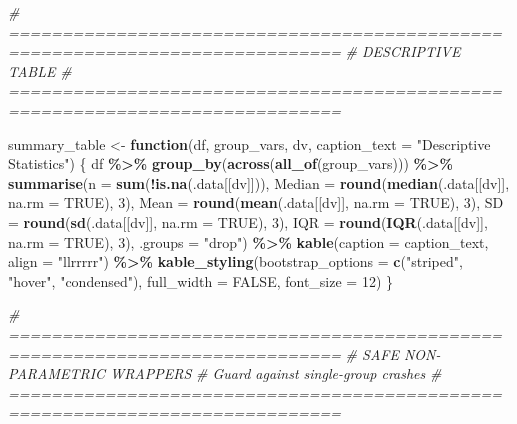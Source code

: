 \documentclass[
]{article}
\newenvironment{Shaded}{\begin{snugshade}}{\end{snugshade}}
\newcommand{\AttributeTok}[1]{\textcolor[rgb]{0.13,0.29,0.53}{#1}}
\newcommand{\CommentTok}[1]{\textcolor[rgb]{0.56,0.35,0.01}{\textit{#1}}}
\newcommand{\ConstantTok}[1]{\textcolor[rgb]{0.56,0.35,0.01}{#1}}
\newcommand{\ControlFlowTok}[1]{\textcolor[rgb]{0.13,0.29,0.53}{\textbf{#1}}}
\newcommand{\DecValTok}[1]{\textcolor[rgb]{0.00,0.00,0.81}{#1}}
\newcommand{\FunctionTok}[1]{\textcolor[rgb]{0.13,0.29,0.53}{\textbf{#1}}}
\newcommand{\NormalTok}[1]{#1}
\newcommand{\OtherTok}[1]{\textcolor[rgb]{0.56,0.35,0.01}{#1}}
\newcommand{\SpecialCharTok}[1]{\textcolor[rgb]{0.81,0.36,0.00}{\textbf{#1}}}
\newcommand{\StringTok}[1]{\textcolor[rgb]{0.31,0.60,0.02}{#1}}
\begin{document}
\begin{Shaded}
\begin{Highlighting}[]
\CommentTok{\# =============================================================================}
\CommentTok{\# DESCRIPTIVE TABLE}
\CommentTok{\# =============================================================================}

\NormalTok{summary\_table }\OtherTok{\textless{}{-}} \ControlFlowTok{function}\NormalTok{(df, group\_vars, dv,}
                          \AttributeTok{caption\_text =} \StringTok{"Descriptive Statistics"}\NormalTok{) \{}
\NormalTok{  df }\SpecialCharTok{\%\textgreater{}\%}
    \FunctionTok{group\_by}\NormalTok{(}\FunctionTok{across}\NormalTok{(}\FunctionTok{all\_of}\NormalTok{(group\_vars))) }\SpecialCharTok{\%\textgreater{}\%}
    \FunctionTok{summarise}\NormalTok{(}\AttributeTok{n      =} \FunctionTok{sum}\NormalTok{(}\SpecialCharTok{!}\FunctionTok{is.na}\NormalTok{(.data[[dv]])),}
              \AttributeTok{Median =} \FunctionTok{round}\NormalTok{(}\FunctionTok{median}\NormalTok{(.data[[dv]], }\AttributeTok{na.rm =} \ConstantTok{TRUE}\NormalTok{), }\DecValTok{3}\NormalTok{),}
              \AttributeTok{Mean   =} \FunctionTok{round}\NormalTok{(}\FunctionTok{mean}\NormalTok{(.data[[dv]],   }\AttributeTok{na.rm =} \ConstantTok{TRUE}\NormalTok{), }\DecValTok{3}\NormalTok{),}
              \AttributeTok{SD     =} \FunctionTok{round}\NormalTok{(}\FunctionTok{sd}\NormalTok{(.data[[dv]],     }\AttributeTok{na.rm =} \ConstantTok{TRUE}\NormalTok{), }\DecValTok{3}\NormalTok{),}
              \AttributeTok{IQR    =} \FunctionTok{round}\NormalTok{(}\FunctionTok{IQR}\NormalTok{(.data[[dv]],    }\AttributeTok{na.rm =} \ConstantTok{TRUE}\NormalTok{), }\DecValTok{3}\NormalTok{),}
              \AttributeTok{.groups =} \StringTok{"drop"}\NormalTok{) }\SpecialCharTok{\%\textgreater{}\%}
    \FunctionTok{kable}\NormalTok{(}\AttributeTok{caption =}\NormalTok{ caption\_text, }\AttributeTok{align =} \StringTok{"llrrrrr"}\NormalTok{) }\SpecialCharTok{\%\textgreater{}\%}
    \FunctionTok{kable\_styling}\NormalTok{(}\AttributeTok{bootstrap\_options =} \FunctionTok{c}\NormalTok{(}\StringTok{"striped"}\NormalTok{, }\StringTok{"hover"}\NormalTok{, }\StringTok{"condensed"}\NormalTok{),}
                  \AttributeTok{full\_width =} \ConstantTok{FALSE}\NormalTok{, }\AttributeTok{font\_size =} \DecValTok{12}\NormalTok{)}
\NormalTok{\}}

\CommentTok{\# =============================================================================}
\CommentTok{\# SAFE NON{-}PARAMETRIC WRAPPERS}
\CommentTok{\# Guard against single{-}group crashes}
\CommentTok{\# =============================================================================}


\end{Highlighting}
\end{Shaded}
\end{document}
